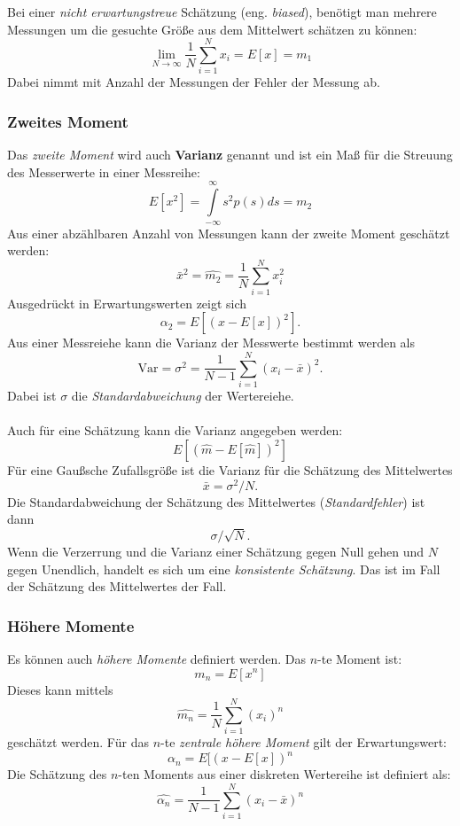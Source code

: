 Bei einer \textit{nicht erwartungstreue} Schätzung (eng. \textsl{biased}), benötigt man mehrere Messungen um die gesuchte Größe aus dem Mittelwert schätzen zu können:
\[
\lim\limits_{N \to \infty}\frac{1}{N}\sum \limits_{i=1}^N x_i=E[x]=m_1
\]
Dabei nimmt mit Anzahl der Messungen der Fehler der Messung ab.

\subsubsection*{Zweites Moment}
Das \textit{zweite Moment} wird auch \textbf{Varianz} genannt und ist ein Maß für die Streuung des Messerwerte in einer Messreihe:
\begin{equation}
E[x^2]= \int\limits_{-\infty}^{\infty} s^2 p(s) ds=m_2
\end{equation}
Aus einer abzählbaren Anzahl von Messungen kann der zweite Moment geschätzt werden:
\begin{equation}
\bar x^2 = \hat{m_2} = \frac{1}{N}\sum\limits_{i=1}^N x_i^2
\end{equation}
Ausgedrückt in Erwartungswerten zeigt sich
\[
\alpha_2 = E[(x-E[x])^2].
\]
Aus einer Messreiehe kann die Varianz der Messwerte bestimmt werden als
\begin{equation}
\mbox{Var} = \sigma^2=\frac{1}{N-1}\sum \limits_{i=1}^N (x_i - \bar x)^2.
\end{equation}
Dabei ist $\sigma$ die \textsl{Standardabweichung} der Wertereiehe.\\\\
Auch für eine Schätzung kann die Varianz angegeben werden:
\[
E[(\hat{m}-E[\hat{m}])^2]
\]
Für eine Gaußsche Zufallsgröße ist die Varianz für die Schätzung des Mittelwertes
\[
\bar x = \sigma^2/N.
\]
Die Standardabweichung der Schätzung des Mittelwertes (\textit{Standardfehler}) ist dann 
\[
\sigma/\sqrt{N}.
\]
Wenn die Verzerrung und die Varianz einer Schätzung gegen Null gehen und $N$ gegen Unendlich, handelt es sich um eine \textit{konsistente Schätzung}. Das ist im Fall der Schätzung des Mittelwertes der Fall.\\

\subsubsection*{Höhere Momente}
Es können auch \textit{höhere Momente} definiert werden. Das $n$-te Moment ist:
\[
m_n=E[x^n]
\]
Dieses kann mittels
\[
\hat{m_n}=\frac {1}{N} \sum\limits_{i=1}^N (x_i)^n
\]
geschätzt werden. 
Für das $n$-te \textit{zentrale höhere Moment} gilt der Erwartungswert:
\[
\alpha_n = E[(x-E[x])^n
\]
Die Schätzung des $n$-ten Moments aus einer diskreten Wertereihe ist definiert als:
\begin{equation}
\hat{\alpha_n}=\frac {1}{N-1} \sum_{i=1}^N (x_i - \bar x)^n
\end{equation}

